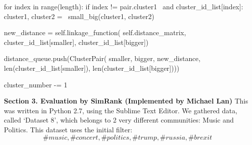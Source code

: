 \documentclass[10pt]{article}
\begin{document}
\begin{python}
            for index in range(length):
                if index != pair.cluster1 \
                        and cluster_id_list[index]:
            cluster1, cluster2 = \
                small_big(cluster1, cluster2)

                    new_distance = self.linkage_function(
                        self.distance_matrix,
                        cluster_id_list[smaller],
                        cluster_id_list[bigger])

                    distance_queue.push(ClusterPair(
                        smaller,
                        bigger,
                        new_distance,
                        len(cluster_id_list[smaller]),
                        len(cluster_id_list[bigger])))

            cluster_number -= 1

\end{python}

{\bf Section 3. Evaluation by SimRank (Implemented by Michael Lan) }
This was written in Python 2.7, using the Sublime Text Editor. We gathered data, called ‘Dataset 8’, which belongs to 2 very different communities: Music and Politics. This dataset uses the initial filter: 
$$\#music, \#concert, \#politics, \#trump, \#russia, \#brexit$$
\end{document}
